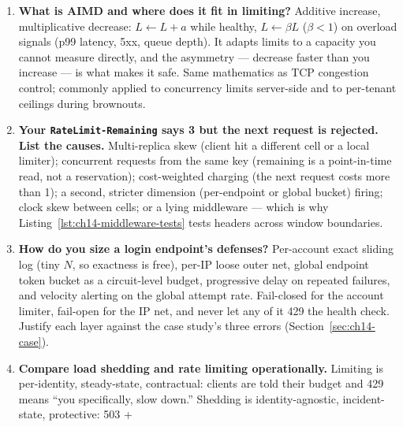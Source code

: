 \begin{enumerate}[label=\textbf{Q\arabic*.}, leftmargin=1.6cm, start=21]
        introspection separately, and debit the score from a per-key token
        bucket \emph{before} execution --- ideally re-measuring after
        execution to calibrate weights. This is the query-cost analysis of
        Chapter~\ref{ch:graphql} wired into this chapter's admission
        machinery; without it, one nested query walks through a
        requests-per-minute limit shaped for REST.
  \item \textbf{What is AIMD and where does it fit in limiting?}
        Additive increase, multiplicative decrease: $L \leftarrow L + a$
        while healthy, $L \leftarrow \beta L$ ($\beta < 1$) on overload
        signals (p99 latency, 5xx, queue depth). It adapts limits to a
        capacity you cannot measure directly, and the asymmetry ---
        decrease faster than you increase --- is what makes it safe. Same
        mathematics as TCP congestion control; commonly applied to
        concurrency limits server-side and to per-tenant ceilings during
        brownouts.
  \item \textbf{Your \texttt{RateLimit-Remaining} says 3 but the next
        request is rejected. List the causes.}
        Multi-replica skew (client hit a different cell or a local
        limiter); concurrent requests from the same key (remaining is a
        point-in-time read, not a reservation); cost-weighted charging (the
        next request costs more than 1); a second, stricter dimension
        (per-endpoint or global bucket) firing; clock skew between cells;
        or a lying middleware --- which is why
        Listing~\ref{lst:ch14-middleware-tests} tests headers across
        window boundaries.
  \item \textbf{How do you size a login endpoint's defenses?}
        Per-account exact sliding log (tiny $N$, so exactness is free),
        per-IP loose outer net, global endpoint token bucket as a
        circuit-level budget, progressive delay on repeated failures, and
        velocity alerting on the global attempt rate. Fail-closed for the
        account limiter, fail-open for the IP net, and never let any of it
        429 the health check. Justify each layer against the case study's
        three errors (Section~\ref{sec:ch14-case}).
  \item \textbf{Compare load shedding and rate limiting operationally.}
        Limiting is per-identity, steady-state, contractual: clients are
        told their budget and 429 means ``you specifically, slow down.''
        Shedding is identity-agnostic, incident-state, protective: 503 +

\end{enumerate}
